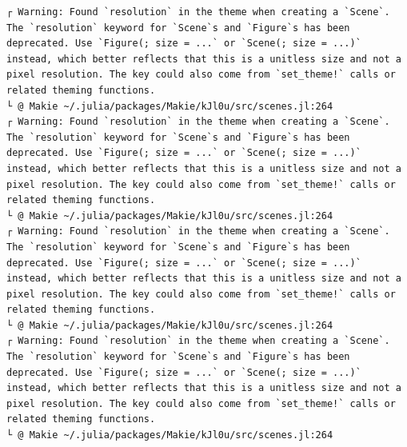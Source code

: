 \documentclass[
  english,
  russian,
  12pt,
  a4paper,
  DIV=11,
  numbers=noendperiod]{scrreprt}
\begin{document}
\begin{verbatim}
┌ Warning: Found `resolution` in the theme when creating a `Scene`. The `resolution` keyword for `Scene`s and `Figure`s has been deprecated. Use `Figure(; size = ...` or `Scene(; size = ...)` instead, which better reflects that this is a unitless size and not a pixel resolution. The key could also come from `set_theme!` calls or related theming functions.
└ @ Makie ~/.julia/packages/Makie/kJl0u/src/scenes.jl:264
┌ Warning: Found `resolution` in the theme when creating a `Scene`. The `resolution` keyword for `Scene`s and `Figure`s has been deprecated. Use `Figure(; size = ...` or `Scene(; size = ...)` instead, which better reflects that this is a unitless size and not a pixel resolution. The key could also come from `set_theme!` calls or related theming functions.
└ @ Makie ~/.julia/packages/Makie/kJl0u/src/scenes.jl:264
┌ Warning: Found `resolution` in the theme when creating a `Scene`. The `resolution` keyword for `Scene`s and `Figure`s has been deprecated. Use `Figure(; size = ...` or `Scene(; size = ...)` instead, which better reflects that this is a unitless size and not a pixel resolution. The key could also come from `set_theme!` calls or related theming functions.
└ @ Makie ~/.julia/packages/Makie/kJl0u/src/scenes.jl:264
┌ Warning: Found `resolution` in the theme when creating a `Scene`. The `resolution` keyword for `Scene`s and `Figure`s has been deprecated. Use `Figure(; size = ...` or `Scene(; size = ...)` instead, which better reflects that this is a unitless size and not a pixel resolution. The key could also come from `set_theme!` calls or related theming functions.
└ @ Makie ~/.julia/packages/Makie/kJl0u/src/scenes.jl:264
\end{verbatim}
\end{document}
